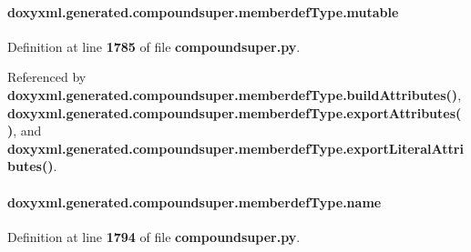 \paragraph[{mutable}]{\setlength{\rightskip}{0pt plus 5cm}doxyxml.\+generated.\+compoundsuper.\+memberdef\+Type.\+mutable}\label{classdoxyxml_1_1generated_1_1compoundsuper_1_1memberdefType_afc00834d1d1ddd85a5a78e9c7da2f56d}


Definition at line {\bf 1785} of file {\bf compoundsuper.\+py}.



Referenced by {\bf doxyxml.\+generated.\+compoundsuper.\+memberdef\+Type.\+build\+Attributes()}, {\bf doxyxml.\+generated.\+compoundsuper.\+memberdef\+Type.\+export\+Attributes()}, and {\bf doxyxml.\+generated.\+compoundsuper.\+memberdef\+Type.\+export\+Literal\+Attributes()}.

\paragraph[{name}]{\setlength{\rightskip}{0pt plus 5cm}doxyxml.\+generated.\+compoundsuper.\+memberdef\+Type.\+name}\label{classdoxyxml_1_1generated_1_1compoundsuper_1_1memberdefType_a8317471ac8cc3615812ed17d75ab26c8}


Definition at line {\bf 1794} of file {\bf compoundsuper.\+py}.



